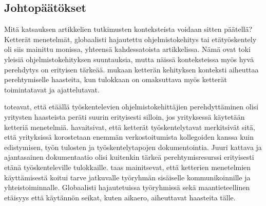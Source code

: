 \documentclass[utf8]{gradu3}
\begin{document}
\subsection{Johtopäätökset}

Mitä katsauksen artikkelien tutkimusten konteksteista voidaan sitten päätellä? Ketterät menetelmät, globaalisti hajautettu ohjelmistokehitys tai etätyöskentely oli siis mainittu monissa, yhteensä kahdessatoista artikkelissa. Nämä ovat toki yleisiä ohjelmistokehityksen suuntauksia, mutta näissä konteksteissa myös hyvä perehdytys on erityisen tärkeää. \textcite{gregory-ym-2020} mukaan ketterän kehityksen konteksti aiheuttaa perehtymiselle haasteita, kun tulokkaan on omaksuttava myös ketterät toimintatavat ja ajattelutavat. 

\textcite{britto-ym-2017} toteavat, että etäällä työskentelevien ohjelmistokehittäjien perehdyttäminen olisi yritysten haasteista peräti suurin erityisesti silloin, jos yrityksessä käytetään ketteriä menetelmiä. \textcite{britto-ym-2017} havaitsivat, että ketterät työskentelytavat merkitsivät sitä, että yrityksissä korostetaan enemmän verkostoitumista kollegoiden kanssa kuin edistymisen, työn tulosten ja työskentelytapojen dokumentointia. Juuri kattava ja ajantasainen dokumentaatio olisi kuitenkin tärkeä perehtymisresurssi erityisesti etänä työskenteleville tulokkaille. \textcite{moe-ym-2020} taas mainitsevat, että ketterien menetelmien käyttämisestä koitui tarve jatkuvalle työryhmän sisäiselle kommunikoinnille ja yhteistoiminnalle. Globaalisti hajautetuissa työryhmissä sekä maantieteellinen etäisyys että käytännön seikat, kuten aikaero, aiheuttavat haasteita tälle.
\end{document}
